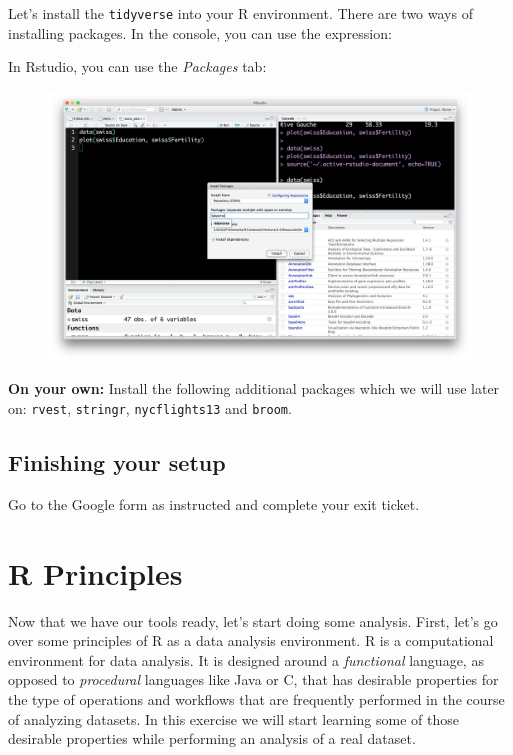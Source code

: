 \documentclass[12pt,]{book}
\theoremstyle{definition}
\theoremstyle{definition}
\theoremstyle{definition}
\theoremstyle{remark}
\begin{document}
Let's install the \texttt{tidyverse} into your R environment. There are
two ways of installing packages. In the console, you can use the
expression:

In Rstudio, you can use the \emph{Packages} tab:

\begin{figure}
\centering
\includegraphics{img/rstudio_install_packages.png}
\caption{}
\end{figure}

\textbf{On your own:} Install the following additional packages which we
will use later on: \texttt{rvest}, \texttt{stringr},
\texttt{nycflights13} and \texttt{broom}.

\section{Finishing your setup}\label{finishing-your-setup}

Go to the Google form as instructed and complete your exit ticket.

\chapter{R Principles}\label{r-principles}

Now that we have our tools ready, let's start doing some analysis.
First, let's go over some principles of R as a data analysis
environment. R is a computational environment for data analysis. It is
designed around a \emph{functional} language, as opposed to
\emph{procedural} languages like Java or C, that has desirable
properties for the type of operations and workflows that are frequently
performed in the course of analyzing datasets. In this exercise we will
start learning some of those desirable properties while performing an
analysis of a real dataset.
\end{document}
